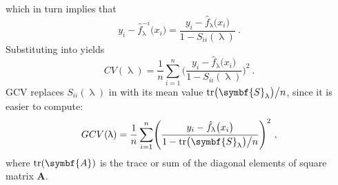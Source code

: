 which in turn implies that
\begin{equation}
  \label{eq:CrossValidationFormalDefinitionOfJackknifedFit3}
  y_i - \hat{f}_\uplambda^{-i}\bigl(x_i\bigr) = \frac{y_i - \hat{f}_\uplambda\bigl(x_i\bigr)}{1 - S_{i i}(\uplambda)}~.
\end{equation}
Substituting  into  yields
\begin{equation}
  \label{eq:CrossValidationSumOfSquares02}
  CV(\uplambda) = \frac{1}{n} \sum_{i = 1}^n\Biggl(\frac{y_i - \hat{f}_\uplambda\bigl(x_i\bigr)}{1 - S_{i i}(\uplambda)}\Biggr)^2~.
\end{equation}
GCV replaces \(S_{ii}(\uplambda)\) in  with its mean value \(\tr\bigl(\symbf{S}_\uplambda\bigr) \big/ n\), since it is easier to compute:
\begin{equation}
  \label{eq:GeneralizedCrossValidation}
  GCV(\uplambda) = \frac{1}{n} \sum_{i = 1}^n\Biggl(\frac{y_i - \hat{f}_\uplambda\bigl(x_i\bigr)}{1 - \tr\bigl(\symbf{S}_\uplambda\bigr) \big/ n}\Biggr)^2~,
\end{equation}
where \(\tr(\symbf{A})\) is the trace or sum of the diagonal elements of square matrix \(\symbf{A}\).

